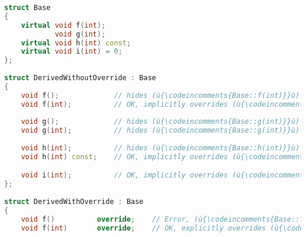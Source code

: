 \begin{lstlisting}[language=C++]
struct Base                                                                     
{                                                                               
    virtual void f(int);                                                        
            void g(int);                                                        
    virtual void h(int) const;                                                    
    virtual void i(int) = 0;
};                                                                              
                                                                               
struct DerivedWithoutOverride : Base                                               
{                                                                               
    void f();             // hides (ù{\codeincomments{Base::f(int)}}ù) (likely mistake)                
    void f(int);          // OK, implicitly overrides (ù{\codeincomments{Base::f(int) }}ù)             
                                                                               
    void g();             // hides (ù{\codeincomments{Base::g(int)}}ù) (likely mistake)                
    void g(int);          // hides (ù{\codeincomments{Base::g(int)}}ù) (likely mistake)                
                                                                               
    void h(int);          // hides (ù{\codeincomments{Base::h(int)}}ù) const (likely mistake)                
    void h(int) const;    // OK, implicitly overrides (ù{\codeincomments{Base::h(int)}}ù) const              

    void i(int);          // OK, implicitly overrides (ù{\codeincomments{Base::i(int)}}ù)
};                                                                              
                                                                               
struct DerivedWithOverride : Base                                               
{                                                                               
    void f()          override;    // Error, (ù{\codeincomments{Base::f()}}ù) not found                         
    void f(int)       override;    // OK, explicitly overrides (ù{\codeincomments{Base::f(int)}}ù)              
                                                                                           

\end{lstlisting}

